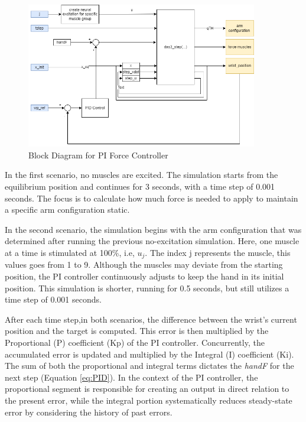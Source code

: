 \begin{figure}[h!]
    \centering
    \includegraphics[width=0.9\textwidth]{Pictures/Model/PIController.png}
    \caption{Block Diagram for PI Force Controller}
    \label{fig:PIBlockDiagram}
\end{figure}

In the first scenario, no muscles are excited. The simulation starts from the equilibrium position and continues for 3 seconds, with a time step of 0.001 seconds. The focus is to calculate how much force is needed to apply to maintain a specific arm configuration static.

In the second scenario, the simulation begins with the arm configuration that was determined after running the previous no-excitation simulation. Here, one muscle at a time is stimulated at 100\%, i.e, $u_{j}$. The index j represents the muscle, this values goes from 1 to 9. Although the muscles may deviate from the starting position, the PI controller continuously adjusts to keep the hand in its initial position. This simulation is shorter, running for 0.5 seconds, but still utilizes a time step of 0.001 seconds.

After each time step,in both scenarios, the difference between the wrist's current position and the target is computed. This error is then multiplied by the Proportional (P) coefficient (Kp) of the PI controller. Concurrently, the accumulated error is updated and multiplied by the Integral (I) coefficient (Ki).  The sum of both the proportional and integral terms dictates the \textit{handF} for the next step (Equation \ref{eq:PID}). In the context of the PI controller, the proportional segment is responsible for creating an output in direct relation to the present error, while the integral portion systematically reduces  steady-state error by considering the history of past errors.

